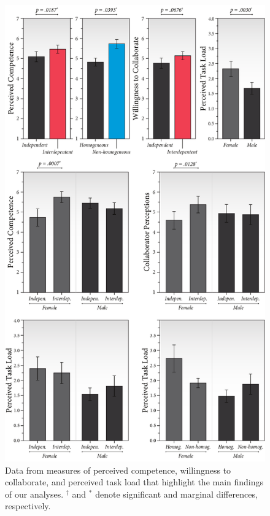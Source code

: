 \begin{figure}[!th]
	\caption{Data from measures of perceived competence, willingness to collaborate, and perceived task load that highlight the main findings of our analyses. $^\dagger$ and $^*$ denote significant and marginal differences, respectively.}
	\label{fig:data}
	\includegraphics[width=\columnwidth]{figures/hri18-aksari-figures_data-figures.pdf}
\end{figure} 

